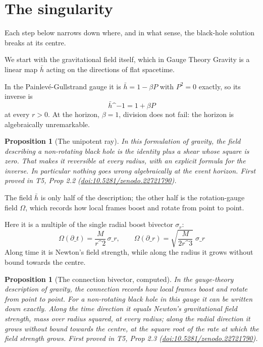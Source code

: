 \documentclass[11pt]{article}
\newtheorem{proposition}[theorem]{Proposition}
\theoremstyle{definition}
\theoremstyle{plain}
\providecommand{\hb}{}\renewcommand{\hb}{\bar{h}}
\begin{document}
\section{The singularity}

Each step below narrows down where, and in what sense, the black-hole solution breaks at its centre.

We start with the gravitational field itself, which in Gauge Theory Gravity is a linear map $\hb$ acting on the directions of flat spacetime.

In the Painlev\'e-Gullstrand gauge it is $\hb = 1 - \beta P$ with $P^2 = 0$ exactly, so its inverse is \[ \hb\^{}{-1} = 1 + \beta P \] at every $r > 0$. At the horizon, $\beta = 1$, division does not fail: the horizon is algebraically unremarkable.

\begin{proposition}[The unipotent ray]\label{c:singularity.unipotent-ray}
In this formulation of gravity, the field describing a non-rotating black hole is the identity plus a shear whose square is zero. That makes it reversible at every radius, with an explicit formula for the inverse. In particular nothing goes wrong algebraically at the event horizon.
\emph{First proved in} T5, Prop 2.2 (\href{https://doi.org/10.5281/zenodo.22721790}{doi:10.5281/zenodo.22721790}).
\end{proposition}

The field $\hb$ is only half of the description; the other half is the rotation-gauge field $\Omega$, which records how local frames boost and rotate from point to point.

Here it is a multiple of the single radial boost bivector $\sigma_r$: \[ \Omega(\partial\_t) = \frac{M}{r\^{}2}\,\sigma\_r, \qquad \Omega(\partial\_r) = \sqrt{\frac{M}{2r\^{}3}}\;\sigma\_r \] Along time it is Newton's field strength, while along the radius it grows without bound towards the centre.

\begin{proposition}[The connection bivector, computed]\label{c:singularity.connection-bivector-computed}
In the gauge-theory description of gravity, the connection records how local frames boost and rotate from point to point. For a non-rotating black hole in this gauge it can be written down exactly. Along the time direction it equals Newton's gravitational field strength, mass over radius squared, at every radius; along the radial direction it grows without bound towards the centre, at the square root of the rate at which the field strength grows.
\emph{First proved in} T5, Prop 2.3 (\href{https://doi.org/10.5281/zenodo.22721790}{doi:10.5281/zenodo.22721790}).
\end{proposition}
\end{document}
